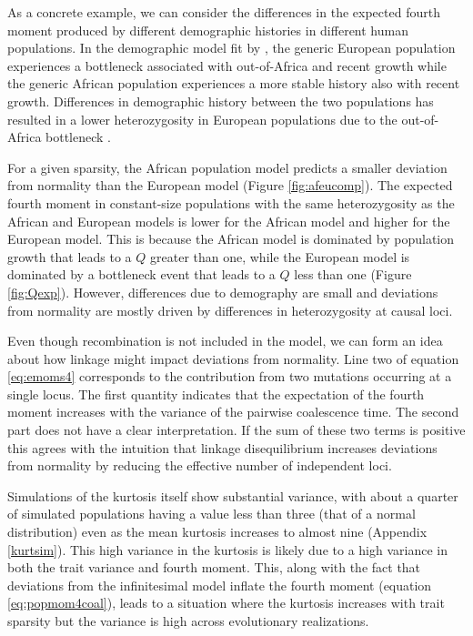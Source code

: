 As a concrete example, we can consider the differences in the expected fourth
moment produced by different demographic histories in different human
populations. In the demographic model fit by \citet{Tennessen2012}, the generic
European population experiences a bottleneck associated with out-of-Africa and
recent growth while the generic African population experiences a more stable
history also with recent growth. Differences in demographic history between the
two populations has resulted in a lower heterozygosity in European populations
due to the out-of-Africa bottleneck \citep{Yu2002}.

For a given sparsity, the African population model predicts a smaller deviation
from normality than the European model (Figure \ref{fig:afeucomp}). The expected
fourth moment in constant-size populations with the same heterozygosity as the
African and European models is lower for the African model and higher for the
European model. This is because the African model is dominated by population
growth that leads to a $Q$ greater than one, while the European model is
dominated by a bottleneck event that leads to a $Q$ less than one
(Figure \ref{fig:Qexp}). However, differences due to demography are small and
deviations from normality are mostly driven by differences in heterozygosity at
causal loci.

Even though recombination is not included in the model, we can form an idea
about how linkage might impact deviations from normality. Line two of
equation \eqref{eq:emoms4} corresponds to the contribution from two mutations
occurring at a single locus. The first quantity indicates that the expectation
of the fourth moment increases with the variance of the pairwise coalescence
time. The second part does not have a clear interpretation. If the sum of these
two terms is positive this agrees with the intuition that linkage disequilibrium
increases deviations from normality by reducing the effective number of
independent loci.

Simulations of the kurtosis itself show substantial variance, with about a
quarter of simulated populations having a value less than three (that of a
normal distribution) even as the mean kurtosis increases to almost nine
(Appendix \ref{kurtsim}). This high variance in the kurtosis is likely due to a
high variance in both the trait variance and fourth moment. This, along with the
fact that deviations from the infinitesimal model inflate the fourth moment
(equation \eqref{eq:popmom4coal}), leads to a situation where the kurtosis
increases with trait sparsity but the variance is high across evolutionary
realizations.
